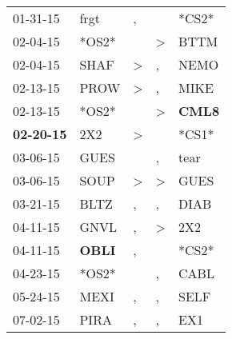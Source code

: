 \begin{supertabular}{p{0.07\textwidth}p{0.06\textwidth}p{0.02\textwidth}p{0.02\textwidth}p{0.06\textwidth}}
          01-31-15\textsuperscript{} &           frgt\textsuperscript{} &                , &                  &                            *CS2* \\
          02-04-15\textsuperscript{} &                            *OS2* &                  &     \textgreater &           BTTM\textsuperscript{} \\
          02-04-15\textsuperscript{} &           SHAF\textsuperscript{} &     \textgreater &                , &           NEMO\textsuperscript{} \\
          02-13-15\textsuperscript{} &           PROW\textsuperscript{} &     \textgreater &                , &           MIKE\textsuperscript{} \\
          02-13-15\textsuperscript{} &                            *OS2* &                  &     \textgreater &  \textbf{CML8\textsuperscript{}} \\
 \textbf{02-20-15\textsuperscript{}} &            2X2\textsuperscript{} &     \textgreater &                  &                            *CS1* \\
          03-06-15\textsuperscript{} &           GUES\textsuperscript{} &                  &                , &           tear\textsuperscript{} \\
          03-06-15\textsuperscript{} &           SOUP\textsuperscript{} &     \textgreater &     \textgreater &           GUES\textsuperscript{} \\
          03-21-15\textsuperscript{} &           BLTZ\textsuperscript{} &                , &                , &           DIAB\textsuperscript{} \\
          04-11-15\textsuperscript{} &           GNVL\textsuperscript{} &                , &     \textgreater &            2X2\textsuperscript{} \\
          04-11-15\textsuperscript{} &  \textbf{OBLI\textsuperscript{}} &                , &                  &                            *CS2* \\
          04-23-15\textsuperscript{} &                            *OS2* &                  &                , &           CABL\textsuperscript{} \\
          05-24-15\textsuperscript{} &           MEXI\textsuperscript{} &                , &                , &           SELF\textsuperscript{} \\
          07-02-15\textsuperscript{} &           PIRA\textsuperscript{} &                , &                , &            EX1\textsuperscript{} \\

\end{supertabular}

